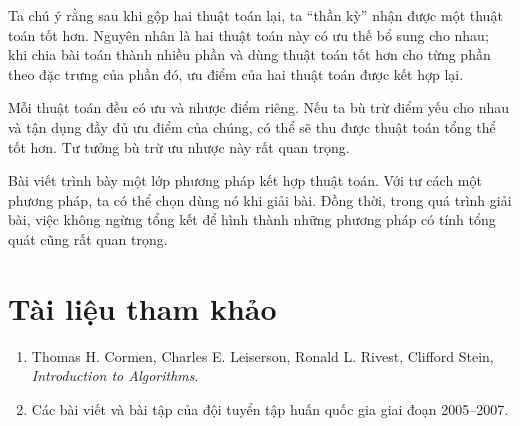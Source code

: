 \documentclass[11pt]{article}
\begin{document}
Ta chú ý rằng sau khi gộp hai thuật toán lại, ta ``thần kỳ'' nhận được một
thuật toán tốt hơn. Nguyên nhân là hai thuật toán này có ưu thế bổ sung cho
nhau; khi chia bài toán thành nhiều phần và dùng thuật toán tốt hơn cho từng
phần theo đặc trưng của phần đó, ưu điểm của hai thuật toán được kết hợp lại.

Mỗi thuật toán đều có ưu và nhược điểm riêng. Nếu ta bù trừ điểm yếu cho nhau
và tận dụng đầy đủ ưu điểm của chúng, có thể sẽ thu được thuật toán tổng thể
tốt hơn. Tư tưởng bù trừ ưu nhược này rất quan trọng.

Bài viết trình bày một lớp phương pháp kết hợp thuật toán. Với tư cách một
phương pháp, ta có thể chọn dùng nó khi giải bài. Đồng thời, trong quá trình
giải bài, việc không ngừng tổng kết để hình thành những phương pháp có tính
tổng quát cũng rất quan trọng.

\section*{Tài liệu tham khảo}

\begin{enumerate}
  \item Thomas H. Cormen, Charles E. Leiserson, Ronald L. Rivest, Clifford
  Stein, \textit{Introduction to Algorithms}.
  \item Các bài viết và bài tập của đội tuyển tập huấn quốc gia giai đoạn
  2005--2007.
\end{enumerate}
\end{document}
